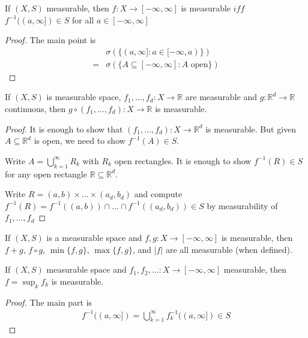 \begin{corollary}
	If $(X,S)$ measurable, then $f : X \to [-\infty, \infty]$ is measurable
	$iff$ $f^{-1}((a,\infty]) \in S$ for all $a \in [-\infty,\infty]$
\end{corollary}

\begin{proof}
	The main point is
	\begin{align*}
		&\sigma(\{(a,\infty] : a \in [-\infty, a)\}) \\
		= &\sigma(\{ A \subseteq [-\infty, \infty] : A \text{ open} \})
	\end{align*}
\end{proof}

\begin{theorem}
	If $(X,S)$ is measurable space,
	$f_1, \ldots, f_d : X \to \mathbb{R}$ are measurable and $g:\mathbb{R}^d \to \mathbb{R}$ continuous, then $g \circ (f_1, \ldots, f_d) : X \to \mathbb{R}$ is measurable.
\end{theorem}

\begin{proof}
	It is enough to show that $(f_1, \ldots, f_d) : X \to \mathbb{R}^d$ is measurable. But given $A \subseteq \mathbb{R}^d$ is open, we need to show $f^{-1}(A) \in S$.

	Write $A = \bigcup_{k=1}^{\infty} R_k$ with $R_k$ open rectangles. It is enough to show $f^{-1}(R) \in S$ for any open rectangle $\mathbb{R} \subseteq \mathbb{R}^d$.

	Write $R = (a,b) \times \ldots \times (a_d, b_d)$ and compute
	$f^{-1}(R) =  f^{-1}((a,b)) \cap \ldots \cap f^{-1}((a_d, b_d)) \in S$
	by measurability of $f_1, \ldots , f_d$
\end{proof}

\begin{corollary}
	If $(X,S)$ is a measurable space and $f,g : X \to [-\infty, \infty]$ is measurable,
	then $f+g$, $f\circ g$, $\min\{f,g\}$, $\max\{f,g\}$, and $|f|$ are all measurable (when defined).
\end{corollary}

\begin{theorem}
	If $(X,S)$ measurable space and $f_1, f_2, \ldots : X \to [-\infty, \infty]$ measurable, then $f = \sup_k f_k$ is measurable.
\end{theorem}

\begin{proof}
	The main part is
	\begin{align*}
		f^{-1}((a, \infty]) = \bigcup_{k=1}^{\infty} f_k^{-1}((a,\infty]) \in S
	\end{align*}
\end{proof}

